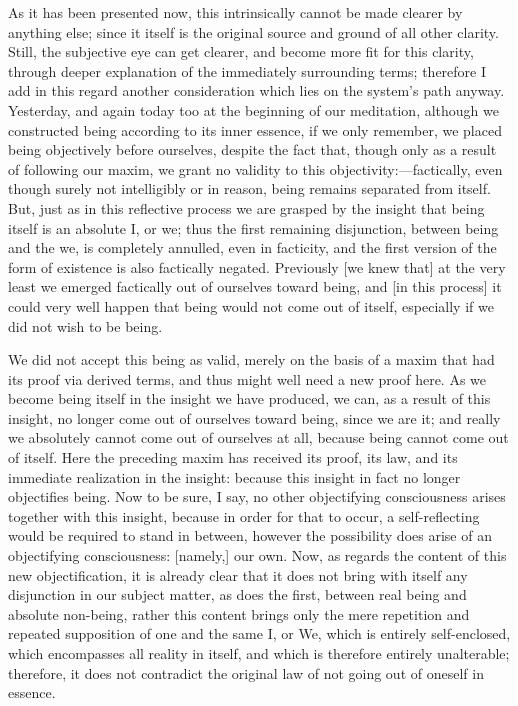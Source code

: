 As it has been presented now,
this intrinsically cannot be made clearer by anything else;
since it itself is the original source
and ground of all other clarity.
Still, the subjective eye can get clearer,
and become more fit for this clarity,
through deeper explanation of the immediately surrounding terms;
therefore I add in this regard another consideration
which lies on the system’s path anyway.
Yesterday, and again today too at the beginning of our meditation,
although we constructed being according to its inner essence,
if we only remember, we placed being objectively before ourselves,
despite the fact that, though only as a result of following our maxim,
we grant no validity to this objectivity:—factically,
even though surely not intelligibly or in reason,
being remains separated from itself.
But, just as in this reflective process we are
grasped by the insight that being itself is an absolute I, or we;
thus the first remaining disjunction,
between being and the we, is completely annulled, even in facticity,
and the first version of the form of existence is also factically negated.
Previously [we knew that] at the very least
we emerged factically out of ourselves toward being,
and [in this process] it could very well happen that
being would not come out of itself,
especially if we did not wish to be being.

We did not accept this being as valid,
merely on the basis of a maxim
that had its proof via derived terms,
and thus might well need a new proof here.
As we become being itself in the insight we have produced,
we can, as a result of this insight, no longer come out
of ourselves toward being, since we are it;
and really we absolutely cannot come out of ourselves at all,
because being cannot come out of itself.
Here the preceding maxim has received its proof,
its law, and its immediate realization in the insight:
because this insight in fact no longer objectifies being.
Now to be sure, I say, no other objectifying consciousness arises
together with this insight, because in order for that to occur,
a self-reflecting would be required to stand in between,
however the possibility does arise of an objectifying consciousness:
[namely,] our own.
Now, as regards the content of this new objectification,
it is already clear that it does not bring with itself
any disjunction in our subject matter,
as does the first, between real being and absolute non-being,
rather this content brings only the mere repetition
and repeated supposition of one and the same I, or We,
which is entirely self-enclosed, which encompasses all reality in itself,
and which is therefore entirely unalterable;
therefore, it does not contradict the original law
of not going out of oneself in essence.

